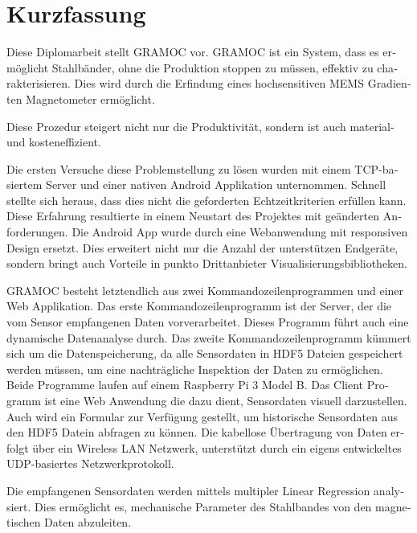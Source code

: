 \chapter{Kurzfassung}
\begin{german}

Diese Diplomarbeit stellt GRAMOC vor. GRAMOC ist ein System, dass es ermöglicht Stahlbänder, ohne die Produktion stoppen zu müssen, effektiv zu charakterisieren. Dies wird durch die Erfindung eines hochsensitiven MEMS Gradienten Magnetometer ermöglicht.

Diese Prozedur steigert nicht nur die Produktivität, sondern ist auch material- und kosteneffizient.

Die ersten Versuche diese Problemstellung zu lösen wurden mit einem TCP-basiertem Server und einer nativen Android Applikation unternommen. Schnell stellte sich heraus, dass dies nicht die geforderten Echtzeitkriterien erfüllen kann. Diese Erfahrung resultierte in einem Neustart des Projektes mit geänderten Anforderungen. Die Android App wurde durch eine Webanwendung mit responsiven Design ersetzt. Dies erweitert nicht nur die Anzahl der unterstützen Endgeräte, sondern bringt auch Vorteile in punkto Drittanbieter Visualisierungsbibliotheken.

GRAMOC besteht letztendlich aus zwei Kommandozeilenprogrammen und einer Web Applikation. Das erste Kommandozeilenprogramm ist der Server, der die vom Sensor empfangenen Daten vorverarbeitet. Dieses Programm führt auch eine dynamische Datenanalyse durch. Das zweite Kommandozeilenprogramm kümmert sich um die Datenspeicherung, da alle Sensordaten in HDF5 Dateien gespeichert werden müssen, um eine nachträgliche Inspektion der Daten zu ermöglichen. Beide Programme laufen auf einem Raspberry Pi 3 Model B. Das Client Programm ist eine Web Anwendung die dazu dient, Sensordaten visuell darzustellen. Auch wird ein Formular zur Verfügung gestellt, um historische Sensordaten aus den HDF5 Datein abfragen zu können. Die kabellose Übertragung von Daten erfolgt über ein Wireless LAN Netzwerk, unterstützt durch ein eigens entwickeltes UDP-basiertes Netzwerkprotokoll.

Die empfangenen Sensordaten werden mittels multipler Linear Regression analysiert. Dies ermöglicht es, mechanische Parameter des Stahlbandes von den magnetischen Daten abzuleiten.

\end{german}
